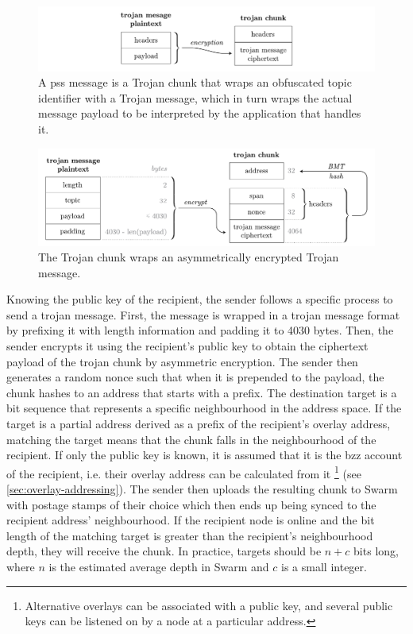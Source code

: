 \begin{figure}[htbp]
\centering
\includegraphics[width=\textwidth]{fig/trojan-generic.pdf}
\caption[Trojan chunk or pss message\statusgreen]{A pss message is a Trojan chunk that wraps an obfuscated topic identifier with a Trojan message, which in turn wraps the actual message payload to be interpreted by the application that handles it.}
\label{fig:trojan-generic}
\end{figure}

\begin{figure}[htbp]
\centering
\includegraphics[width=\textwidth]{fig/trojan-chunk-3.pdf}
\caption[Trojan chunk\statusgreen]{The Trojan chunk wraps an asymmetrically encrypted Trojan message.}
\label{fig:trojan-chunk}
\end{figure}

Knowing the public key of the recipient, the sender follows a specific process to send a trojan message. First, the message is wrapped in a trojan message format by prefixing it with length information and padding it to 4030 bytes. Then, the sender encrypts it using the recipient's public key to obtain the ciphertext payload of the trojan chunk by asymmetric encryption. The sender then generates a random nonce such that when it is prepended to the payload, the chunk hashes to an address that starts with a  prefix. The destination target is a bit sequence that represents a specific neighbourhood in the address space. If the target is a partial address derived as a prefix of the recipient's overlay address, matching the target means that the chunk falls in the neighbourhood of the recipient. If only the public key is known, it is assumed that it is the bzz account of the recipient, i.e. their overlay address can be calculated from it%
%
\footnote{Alternative overlays can be associated with a public key, and several public keys can be listened on by a node at a particular address.}
%
(see \ref{sec:overlay-addressing}). The sender then uploads the resulting chunk to Swarm with postage stamps of their choice which then ends up being synced to the recipient address' neighbourhood. If the recipient node is online and the bit length of the matching target is greater than the recipient's neighbourhood depth, they will receive the chunk. In practice, targets should be $n+c$ bits long, where $n$ is the estimated average depth in Swarm and $c$ is a small integer. 

